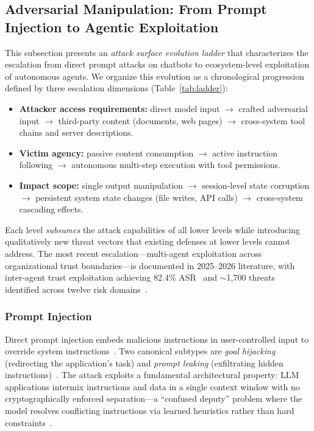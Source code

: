 \subsection{Adversarial Manipulation: From Prompt Injection  to Agentic Exploitation}
\label{sec:threat-adversarial}


This subsection presents an \emph{attack surface evolution ladder} that characterizes the escalation from direct prompt attacks on chatbots to ecosystem-level exploitation of autonomous agents. We organize this evolution as a chronological progression defined by three escalation dimensions (Table~\ref{tab:ladder}):
\begin{itemize}[nosep,leftmargin=1.5em]
    \item \textbf{Attacker access requirements:} direct model input $\to$ crafted adversarial input $\to$ third-party content (documents, web pages) $\to$ cross-system tool chains and server descriptions.
    \item \textbf{Victim agency:} passive content consumption $\to$ active instruction following $\to$ autonomous multi-step execution with tool permissions.
    \item \textbf{Impact scope:} single output manipulation $\to$ session-level state corruption $\to$ persistent system state changes (file writes, API calls) $\to$ cross-system cascading effects.
\end{itemize}
Each level \emph{subsumes} the attack capabilities of all lower levels while introducing qualitatively new threat vectors that existing defenses at lower levels cannot address. The most recent escalation---multi-agent exploitation across organizational trust boundaries---is documented in 2025--2026 literature, with inter-agent trust exploitation achieving 82.4\% ASR~\cite{darkside2025agents} and $\sim$1,700 threats identified across twelve risk domains~\cite{multiagent2026threats}.



\subsubsection{Prompt Injection}
\label{sec:threat-pi}

Direct prompt injection embeds malicious instructions in user-controlled input to override system instructions~\cite{perez2022ignore}. Two canonical subtypes are \emph{goal hijacking} (redirecting the application's task) and \emph{prompt leaking} (exfiltrating hidden instructions)~\cite{perez2022ignore}. The attack exploits a fundamental architectural property: LLM applications intermix instructions and data in a single context window with no cryptographically enforced separation---a ``confused deputy'' problem where the model resolves conflicting instructions via learned heuristics rather than hard constraints~\cite{greshake2023ipi}.

